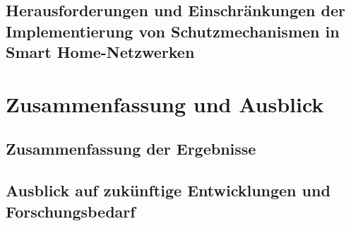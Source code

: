 \subsection{Herausforderungen und Einschränkungen der Implementierung von Schutzmechanismen in Smart Home-Netzwerken}

\newpage
\section{Zusammenfassung und Ausblick}

\subsection{Zusammenfassung der Ergebnisse}
\subsection{Ausblick auf zukünftige Entwicklungen und Forschungsbedarf}

\newpage

    \nocite{*}
    
    


